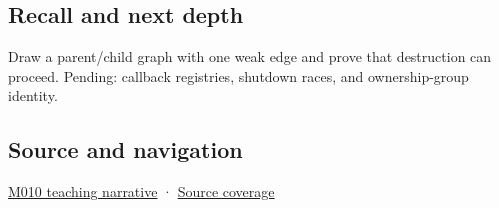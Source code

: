 \subsection{Recall and next depth}\label{recall-and-next-depth}

Draw a parent/child graph with one weak edge and prove that destruction can proceed. Pending: callback registries, shutdown races, and ownership-group identity.

\subsection{Source and navigation}\label{source-and-navigation}

\href{Continuous\%20Notes/Computing\%20Foundations\%20-\%20From\%20Bits\%20to\%20C++\%20and\%20Systems\%20APIs\#Weak\%20observation\%20breaks\%20cycles\%20without\%20pretending\%20an\%20object\%20is\%20alive}{M010 teaching narrative} · \hyperref[appendix-fd090d982a15]{Source coverage}
